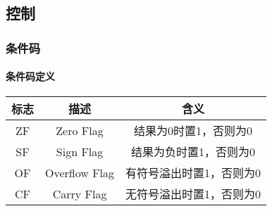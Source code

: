 \subsection{控制}
\subsubsection{条件码}
\paragraph{条件码定义}
\begin{table}[H]
    \centering
    \begin{tabular}{|c|c|c|}
        \hline
        \textbf{标志} & \textbf{描述} & \textbf{含义} \\
        \hline
        ZF & Zero Flag & 结果为0时置1，否则为0 \\
        \hline
        SF & Sign Flag & 结果为负时置1，否则为0 \\
        \hline
        OF & Overflow Flag & 有符号溢出时置1，否则为0 \\
        \hline
        CF & Carry Flag & 无符号溢出时置1，否则为0 \\
        \hline
    \end{tabular}
\end{table}
